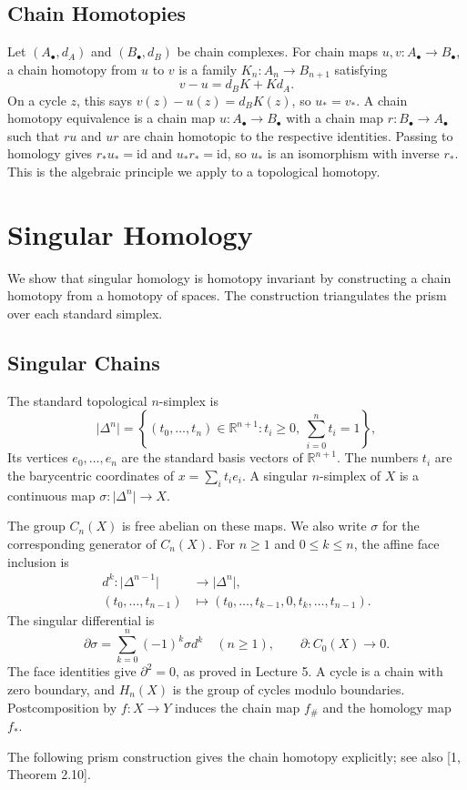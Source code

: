 \documentclass[11pt]{article}
\newcommand{\facehead}[1]{\par\Needspace{4\baselineskip}\subsection{#1}}
\begin{document}
\facehead{Chain Homotopies}

Let $(A_\bullet,d_A)$ and $(B_\bullet,d_B)$ be chain complexes. For chain maps $u,v:A_\bullet\to B_\bullet$, a chain homotopy from $u$ to $v$ is a family $K_n:A_n\to B_{n+1}$ satisfying
\[v-u=d_BK+Kd_A.\]
On a cycle $z$, this says $v(z)-u(z)=d_BK(z)$, so $u_*=v_*$. A chain homotopy equivalence is a chain map $u:A_\bullet\to B_\bullet$ with a chain map $r:B_\bullet\to A_\bullet$ such that $ru$ and $ur$ are chain homotopic to the respective identities. Passing to homology gives $r_*u_*=\mathrm{id}$ and $u_*r_*=\mathrm{id}$, so $u_*$ is an isomorphism with inverse $r_*$. This is the algebraic principle we apply to a topological homotopy.

\section{Singular Homology}\label{sec:singular-homology}
We show that singular homology is homotopy invariant by constructing a chain homotopy from a homotopy of spaces. The construction triangulates the prism over each standard simplex.

\facehead{Singular Chains}
The standard topological $n$-simplex is
\[
\lvert\Delta^n\rvert
=\left\{(t_0,\ldots,t_n)\in\mathbb R^{n+1}:t_i\ge0,\ \sum_{i=0}^nt_i=1\right\},
\]
Its vertices $e_0,\ldots,e_n$ are the standard basis vectors of $\mathbb R^{n+1}$.
The numbers $t_i$ are the barycentric coordinates of $x=\sum_i t_ie_i$.
A singular $n$-simplex of $X$ is a continuous map $\sigma:\lvert\Delta^n\rvert\to X$.

The group $C_n(X)$ is free abelian on these maps. We also write $\sigma$ for the corresponding generator of $C_n(X)$.
For $n\ge1$ and $0\le k\le n$, the affine face inclusion is
\[
\begin{aligned}
d^k:\lvert\Delta^{n-1}\rvert&\longrightarrow\lvert\Delta^n\rvert,\\
(t_0,\ldots,t_{n-1})&\longmapsto(t_0,\ldots,t_{k-1},0,t_k,\ldots,t_{n-1}).
\end{aligned}
\]
The singular differential is
\[
\partial\sigma=\sum_{k=0}^n(-1)^k\sigma d^k\quad(n\ge1),
\qquad \partial:C_0(X)\longrightarrow0.
\]
The face identities give $\partial^2=0$, as proved in Lecture 5. A cycle is a chain with zero boundary, and $H_n(X)$ is the group of cycles modulo boundaries. Postcomposition by $f:X\to Y$ induces the chain map $f_\#$ and the homology map $f_*$.

The following prism construction gives the chain homotopy explicitly; see also [1, Theorem 2.10].
\end{document}
